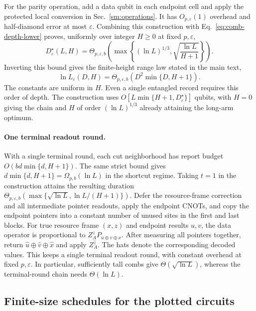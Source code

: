 \documentclass[aps,prl,twocolumn,superscriptaddress,longbibliography,reprint,floatfix]{revtex4-2}
\newcommand{\eps}{\varepsilon}
\begin{document}
For the parity operation, add a data qubit in each endpoint cell and
apply the protected local conversion in Sec.~\ref{sm:operations}.
It has $O_{p,\eps}(1)$ overhead and half-diamond error at most $\eps$.
Combining this construction with
Eq.~\eqref{eq:comb-depth-lower} proves, uniformly over integer $H\ge0$
at fixed $p,\eps$,
\begin{equation}
 D^\star_\eps(L,H)=\Theta_{p,\eps,b}\!\left(
 \max\left\{(\ln L)^{1/3},
       \sqrt{\frac{\ln L}{H+1}}\right\}\right).
 \label{eq:comb-depth-optimal}
\end{equation}
Inverting this bound gives the finite-height range law stated in the
main text,
\begin{equation}
 \ln L_\eps(D,H)
 =\Theta_{p,\eps,b}\!\left(D^2\min\{D,H+1\}\right).
 \label{eq:comb-reach}
\end{equation}
The constants are uniform in $H$. Even a single entangled record
requires this order of depth. The construction uses
$O[L\min\{H+1,D^\star_\eps\}]$ qubits, with $H=0$ giving the chain
and $H$ of order $(\ln L)^{1/3}$ already attaining the long-arm optimum.

\paragraph*{One terminal readout round.}
With a single terminal round, each cut neighborhood has report budget
$O(bd\min\{d,H+1\})$. The same strict bound gives
$d\min\{d,H+1\}=\Omega_{p,b}(\ln L)$ in the shortcut regime.
Taking $t=1$ in the construction attains the resulting duration
$\Theta_{p,\eps,b}(\max\{\sqrt{\ln L},\ln L/(H+1)\})$.
Defer the resource-frame correction and all intermediate pointer
readouts, apply the endpoint CNOTs, and copy the endpoint pointers into
a constant number of unused sites in the first and last blocks.
For true resource frame $(x,z)$ and endpoint results $u,v$, the data
operator is proportional to $Z_A^zP_{u\oplus v\oplus x}$.
After measuring all pointers together, return
$\hat u\oplus\hat v\oplus\hat x$ and apply $Z_A^{\hat z}$.
The hats denote the corresponding decoded values.
This keeps a single terminal readout round, with constant overhead
at fixed $p,\eps$. In particular, sufficiently tall combs give
$\Theta(\sqrt{\ln L})$, whereas the terminal-round chain needs
$\Theta(\ln L)$.

\subsection{Finite-size schedules for the plotted circuits}
\label{sec:finite-comb-schedules}
\end{document}
